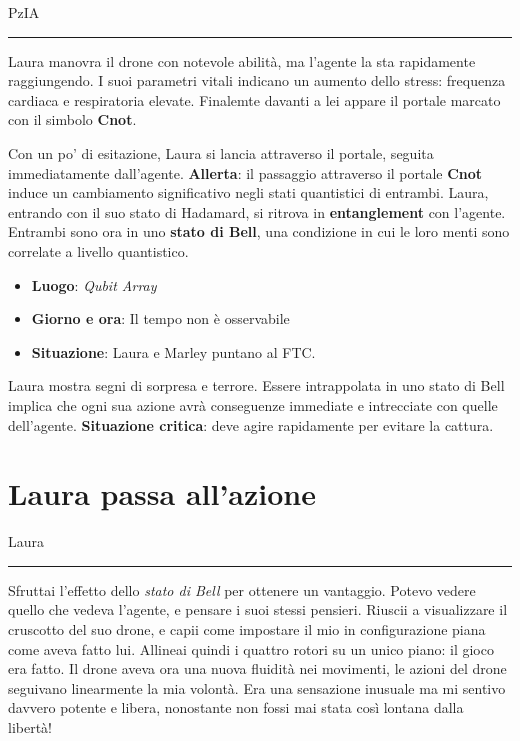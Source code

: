 
\vspace{1em}
\begin{center}PzIA\end{center}
\hrule
\vspace{1em}

Laura manovra il drone con notevole abilità, ma l'agente la sta rapidamente raggiungendo. I suoi parametri vitali indicano un aumento dello stress: frequenza cardiaca e respiratoria elevate. Finalemte davanti a lei appare il portale marcato con il simbolo \textbf{Cnot}.

Con un po' di esitazione, Laura si lancia attraverso il portale, seguita immediatamente dall'agente. \textbf{Allerta}: il passaggio attraverso il portale \textbf{Cnot} induce un cambiamento significativo negli stati quantistici di entrambi. Laura, entrando con il suo stato di Hadamard, si ritrova in \textbf{entanglement} con l'agente. Entrambi sono ora in uno \textbf{stato di Bell}, una condizione in cui le loro menti sono correlate a livello quantistico.

\begin{tcolorbox}[colback=gray!5,colframe=gray!80,title=\textbf{Scheda Informativa}]
\begin{itemize}
    \item \textbf{Luogo}: \emph{Qubit Array}
    \item \textbf{Giorno e ora}: Il tempo non è osservabile
    \item \textbf{Situazione}: Laura e Marley puntano al FTC.
\end{itemize}
\end{tcolorbox}

Laura mostra segni di sorpresa e terrore. Essere intrappolata in uno stato di Bell implica che ogni sua azione avrà conseguenze immediate e intrecciate con quelle dell'agente. \textbf{Situazione critica}: deve agire rapidamente per evitare la cattura.

\section{Laura passa all'azione}
\vspace{1em}
\begin{center}Laura\end{center}
\hrule
\vspace{1em}

Sfruttai l'effetto dello \textit{stato di Bell} per ottenere un vantaggio. Potevo vedere quello che vedeva l'agente, e pensare i suoi stessi pensieri. Riuscii a visualizzare il cruscotto del suo drone, e capii come  impostare il mio in  configurazione piana come aveva fatto lui. Allineai quindi i quattro rotori su un unico piano: il gioco era fatto. Il drone aveva ora una nuova fluidità nei movimenti, le azioni del  drone seguivano linearmente la mia volontà. Era una sensazione inusuale ma mi sentivo davvero potente e libera, nonostante non fossi mai stata così lontana dalla libertà!

